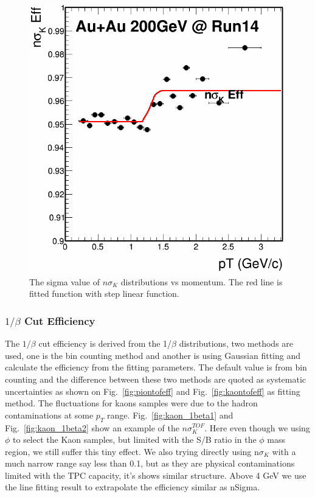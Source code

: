 \begin{figure}[htbp]
\begin{minipage}[htbp]{0.5\linewidth}
\includegraphics[width=1.0\textwidth]{figure/Run14_D0HFT/nSigKaon_Eff.png}
\caption{The sigma value of $n\sigma_{K}$ distributions vs momentum. The red line is fitted function with step linear function. \label{fig:kaonsigma}}
\end{minipage}
\end{figure}

\subsubsection{$1/\beta$ Cut Efficiency}
The $1/\beta$ cut efficiency is derived from the 1/$\beta$ distributions, two methods are used, one is the bin counting method and another is using Gaussian fitting and calculate the efficiency from the fitting parameters. The default value is from bin counting and the difference between these two methods are quoted as systematic uncertainties as shown on Fig.~\ref{fig:piontofeff} and Fig.~\ref{fig:kaontofeff} as fitting method. The fluctuations for kaons samples were due to the hadron contaminations at some $p_T$ range. Fig.~\ref{fig:kaon_1beta1} and Fig.~\ref{fig:kaon_1beta2} show an example of the $n\sigma_{K}^{TOF}$. Here even though we using $\phi$ to select the Kaon samples, but limited with the S/B ratio in the $\phi$ mass region, we still suffer this tiny effect. We also trying directly using n$\sigma_{K}$ with a much narrow range say less than 0.1, but as they are physical contaminations limited with the TPC capacity, it's shows similar structure. Above 4 GeV we use the line fitting result to extrapolate the efficiency similar as nSigma.

